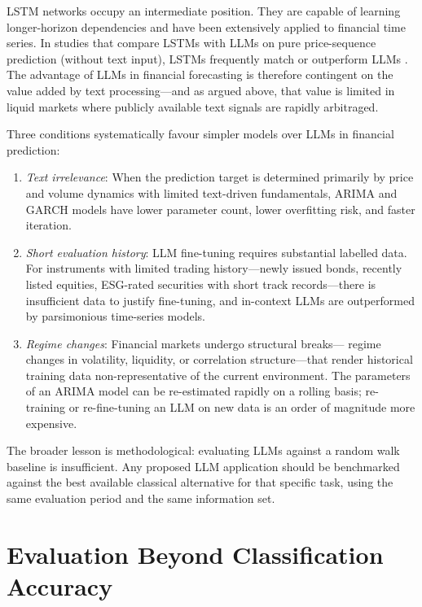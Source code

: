LSTM networks \cite{hochreiter1997long} occupy an intermediate position. They are
capable of learning longer-horizon dependencies and have been extensively applied to
financial time series. In studies that compare LSTMs with LLMs on pure price-sequence
prediction (without text input), LSTMs frequently match or outperform LLMs
\cite{zhao2025frontiers}. The advantage of LLMs in financial forecasting is therefore
contingent on the value added by text processing---and as argued above, that value is
limited in liquid markets where publicly available text signals are rapidly arbitraged.

Three conditions systematically favour simpler models over LLMs in financial prediction:

\begin{enumerate}
  \item \emph{Text irrelevance}: When the prediction target is determined primarily by
        price and volume dynamics with limited text-driven fundamentals, ARIMA and GARCH
        models have lower parameter count, lower overfitting risk, and faster iteration.
  \item \emph{Short evaluation history}: LLM fine-tuning requires substantial labelled
        data. For instruments with limited trading history---newly issued bonds, recently
        listed equities, ESG-rated securities with short track records---there is
        insufficient data to justify fine-tuning, and in-context LLMs are outperformed
        by parsimonious time-series models.
  \item \emph{Regime changes}: Financial markets undergo structural breaks---
        regime changes in volatility, liquidity, or correlation structure---that render
        historical training data non-representative of the current environment. The
        parameters of an ARIMA model can be re-estimated rapidly on a rolling basis;
        re-training or re-fine-tuning an LLM on new data is an order of magnitude
        more expensive.
\end{enumerate}

The broader lesson is methodological: evaluating LLMs against a random walk baseline
is insufficient. Any proposed LLM application should be benchmarked against the best
available classical alternative for that specific task, using the same evaluation
period and the same information set.

\section{Evaluation Beyond Classification Accuracy}
\label{sec:ch13-evaluation-beyond-accuracy}

